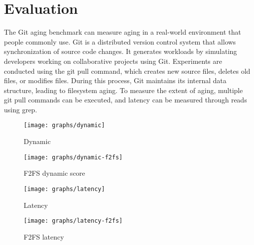 \section{Evaluation}
\label{s:eval}




The Git aging benchmark\cite{conway:login17,senescence:fast17} can measure aging in a real-world environment that people commonly use.
Git is a distributed version control system that allows synchronization of source code changes.
It generates workloads by simulating developers working on collaborative projects using Git.
Experiments are conducted using the git pull command, which creates new source files, deletes old files, or modifies files. During this process, Git maintains its internal data structure, leading to filesystem aging.
To measure the extent of aging, multiple git pull commands can be executed, and latency can be measured through reads using grep.


\begin{figure}[t]
    \centering
    \texttt{[image: graphs/dynamic]}
    \caption{Dynamic}
    \label{fig:dynamic}
\end{figure}

\begin{figure}[t]
    \centering
    \texttt{[image: graphs/dynamic-f2fs]}
    \caption{F2FS dynamic score}
    \label{fig:f2fs_dynamic_score}
\end{figure}


\begin{figure}[t]
    \centering
    \texttt{[image: graphs/latency]}
    \caption{Latency}
    \label{fig:latency}
\end{figure}

\begin{figure}[t]
    \centering
    \texttt{[image: graphs/latency-f2fs]}
    \caption{F2FS latency}
    \label{fig:f2fs_latency}
\end{figure}
